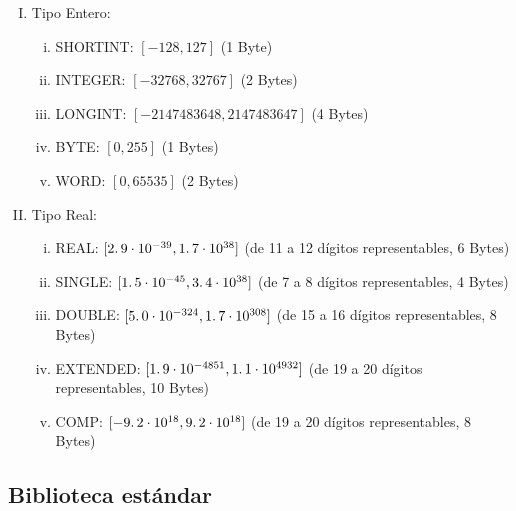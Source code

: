 \begin{enumerate}[I.]
\item {}Tipo Entero:

\begin{enumerate}[i.]
\item SHORTINT: $[-128, 127]$ (1 Byte)
\item INTEGER: $[-32768, 32767]$ (2 Bytes)
\item LONGINT: $[-2147483648, 2147483647]$ (4 Bytes)
\item BYTE: $[0, 255]$ (1 Bytes)
\item WORD: $[0, 65535]$ (2 Bytes)
\end{enumerate}
 
\item {}Tipo Real:

\begin{enumerate}[i.]
\item REAL: $[2\ldotp9\cdot 10^{-39}, 1\ldotp7\cdot10^{38}]$ (de 11 a 12 dígitos
representables, 6 Bytes)
\item SINGLE: $[1\ldotp5\cdot 10^{-45}, 3\ldotp4\cdot10^{38}]$ (de 7 a 8 dígitos
representables, 4 Bytes)
\item DOUBLE: $[5\ldotp0\cdot 10^{-324}, 1\ldotp7\cdot10^{308}]$ (de 15 a 16
dígitos representables, 8 Bytes)
\item EXTENDED: $[1\ldotp9\cdot 10^{-4851}, 1\ldotp1\cdot10^{4932}]$ (de 19 a 20
dígitos representables, 10 Bytes)
\item COMP: $[-9\ldotp2\cdot 10^{18}, 9\ldotp2\cdot10^{18}]$ (de 19 a 20 dígitos
representables, 8 Bytes)
\end{enumerate}
\end{enumerate}

\subsection{Biblioteca estándar}

